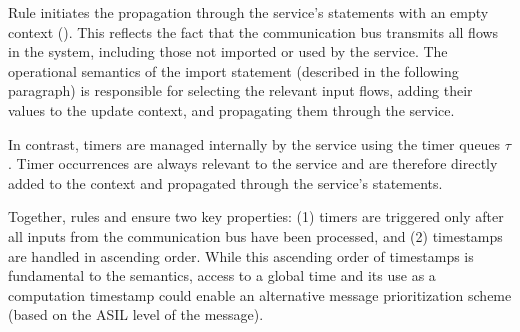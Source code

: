 \begin{remark}
    Rule  initiates the propagation through
    the service's statements with an empty context (\emptygamma). This reflects the fact that the
    communication bus transmits all flows in the system, including those not imported or used by the
    service. The operational semantics of the import statement (described in the following
    paragraph) is responsible for selecting the relevant input flows, adding their values to the
    update context, and propagating them through the service.

    In contrast, timers are managed internally by the service using the timer queues $\tau$. Timer
    occurrences are always relevant to the service and are therefore directly added to the context
    and propagated through the service's statements.

    Together, rules  and
     ensure two key properties: (1) timers
    are triggered only after all inputs from the communication bus have been processed, and (2)
    timestamps are handled in ascending order. While this ascending order of timestamps is
    fundamental to the semantics, access to a global time and its use as a computation timestamp
    could enable an alternative message prioritization scheme (\eg based on the ASIL level of the
    message).
\end{remark}

